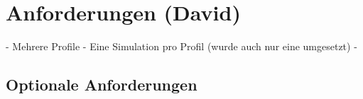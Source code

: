 \chapter{Anforderungen (David)}
\label{chap:anf}

	- Mehrere Profile
	- Eine Simulation pro Profil (wurde auch nur eine umgesetzt)
	- 

	\section{Optionale Anforderungen}
	\label{sec:optionale-anf}
